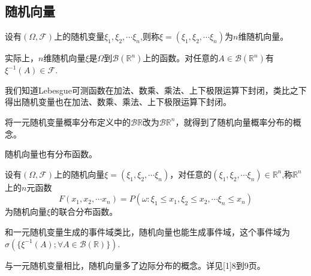 \documentclass[lang=cn,10pt]{elegantbook}
\begin{document}
\subsection{随机向量}
\begin{definition}[随机向量]
	设有\((\Omega,\mathcal{F})\)上的随机变量\(\xi_1,\xi_2,\cdots \xi_n\),则称\(\xi=(\xi_1,\xi_2,\cdots \xi_n)\)为\(n\)维随机向量。
\end{definition}
\begin{note}
	实际上，\(n\)维随机向量\(\xi\)是\(\Omega\)到\(\mathcal{B}(\mathbb{R}^n)\)上的函数。对任意的\(A\in \mathcal{B}(\mathbb{R}^n)\)有\(\xi^{-1}(A)\in \mathcal{F}\).
\end{note}
我们知道Lebesgue可测函数在加法、数乘、乘法、上下极限运算下封闭，类比之下得出随机变量也在加法、数乘、乘法、上下极限运算下封闭。

将一元随机变量概率分布定义中的\(\mathcal{B}\mathbb{R}\)改为\(\mathcal{B}\mathbb{R}^n\)，就得到了随机向量概率分布的概念。

随机向量也有分布函数。
\begin{definition}[联合分布函数]
	设有\((\Omega,\mathcal{F})\)上的随机向量\(\xi=(\xi_1,\xi_2,\cdots \xi_n)\)，对任意的\((\xi_1,\xi_2,\cdots \xi_n)\in \mathbb{R}^n\),称\(\mathbb{R}^n\)上的\(n\)元函数
	\[F(x_1,x_2,\cdots x_n)=P(\omega:\xi_1\le x_1,\xi_2\le x_2,\cdots \xi_n\le x_n)\]
	为随机向量\(\xi\)的联合分布函数。
\end{definition}
和一元随机变量生成的事件域类比，随机向量也能生成事件域，这个事件域为\(\sigma(\{\xi^{-1}(A);\forall A\in \mathcal{B}(\mathbb{R})\})\).

	与一元随机变量相比，随机向量多了边际分布的概念。详见[1]8到9页。
\end{document}
